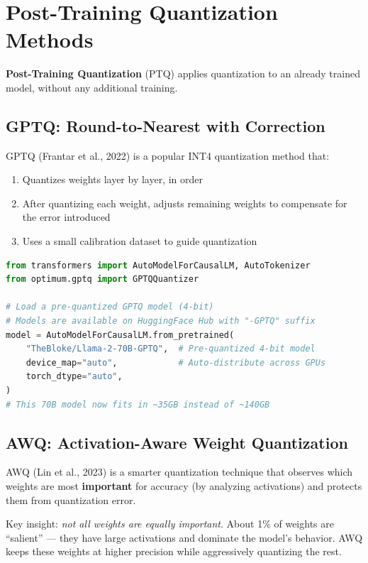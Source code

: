 \documentclass[10pt, oneside, openany]{book}
\newcommand{\keyterm}[1]{\textbf{\color{AccentOrange}#1}}
\begin{document}
\section{Post-Training Quantization Methods}

\keyterm{Post-Training Quantization} (PTQ) applies quantization to an already
trained model, without any additional training.

\subsection{GPTQ: Round-to-Nearest with Correction}

GPTQ (Frantar et al., 2022) is a popular INT4 quantization method that:
\begin{enumerate}
  \item Quantizes weights layer by layer, in order
  \item After quantizing each weight, adjusts remaining weights to compensate
        for the error introduced
  \item Uses a small calibration dataset to guide quantization
\end{enumerate}

\begin{lstlisting}[language=Python, caption={Loading a GPTQ quantized model}]
from transformers import AutoModelForCausalLM, AutoTokenizer
from optimum.gptq import GPTQQuantizer

# Load a pre-quantized GPTQ model (4-bit)
# Models are available on HuggingFace Hub with "-GPTQ" suffix
model = AutoModelForCausalLM.from_pretrained(
    "TheBloke/Llama-2-70B-GPTQ",  # Pre-quantized 4-bit model
    device_map="auto",            # Auto-distribute across GPUs
    torch_dtype="auto",
)
# This 70B model now fits in ~35GB instead of ~140GB
\end{lstlisting}

\subsection{AWQ: Activation-Aware Weight Quantization}

AWQ (Lin et al., 2023) is a smarter quantization technique that observes which
weights are most \textbf{important} for accuracy (by analyzing activations) and
protects them from quantization error.

Key insight: \textit{not all weights are equally important}.  About 1\% of
weights are ``salient'' --- they have large activations and dominate the model's
behavior.  AWQ keeps these weights at higher precision while aggressively
quantizing the rest.
\end{document}
